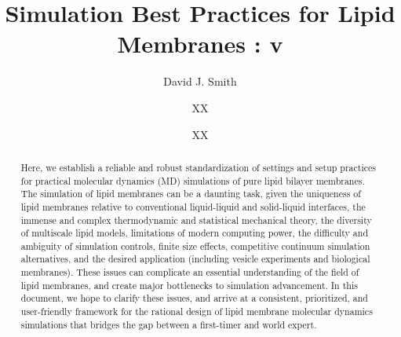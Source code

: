 \documentclass[9pt,bestpractices]{livecoms}
\title{Simulation Best Practices for Lipid Membranes : v\versionnumber}
\author[1*]{David J. Smith}
\author[2*]{XX}
\author[3*]{XX}
\affil[1]{Department of Chemical Engineering, University of California, Santa Barbara, Santa Barbara, CA, USA}
\affil[2]{XX}
\affil[3]{XX}
\begin{document}
\begin{frontmatter}
\maketitle

\begin{abstract}

Here, we establish a reliable and robust standardization of settings and setup practices for practical molecular dynamics (MD) simulations of pure lipid bilayer membranes.
The simulation of lipid membranes can be a daunting task, given the uniqueness of lipid membranes relative to conventional liquid-liquid and solid-liquid interfaces, the immense and complex thermodynamic and statistical mechanical theory, the diversity of multiscale lipid models, limitations of modern computing power, the difficulty and ambiguity of simulation controls, finite size effects, competitive continuum simulation alternatives, and the desired application (including vesicle experiments and biological membranes).
These issues can complicate an essential understanding of the field of lipid membranes, and create major bottlenecks to simulation advancement.
In this document, we hope to clarify these issues, and arrive at a consistent, prioritized, and user-friendly framework for the rational design of lipid membrane molecular dynamics simulations that bridges the gap between a first-timer and world expert.


\end{abstract}
\end{frontmatter}
\end{document}
